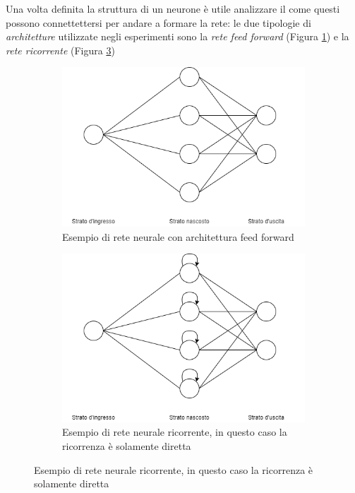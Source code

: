 \documentclass[../../main.tex]{subfiles}
\begin{document}
Una volta definita la struttura di un neurone è utile analizzare il come questi possono connettettersi per andare a formare la rete: le due tipologie di \textit{architetture} utilizzate negli esperimenti sono la \textit{rete feed forward} (Figura \ref{fig:feedforward}) e la \textit{rete ricorrente} (Figura \ref{fig:RNN})

\begin{figure}[H]
    \begin{subfigure}[]{0.48\textwidth}
        \centering
        \includegraphics[width = \textwidth]{immagini/4_2/feed_forward.png}
        \caption{Esempio di rete neurale con architettura feed forward}
        \label{fig:feedforward}        
    \end{subfigure}
    \begin{subfigure}[]{0.48\textwidth}
        \centering
        \includegraphics[width = \textwidth]{immagini/4_2/RNN.png}
        \caption{Esempio di rete neurale ricorrente, in questo caso la ricorrenza è solamente diretta}
        \label{fig:RNN}
    \end{subfigure}
\end{figure}
\end{document}
